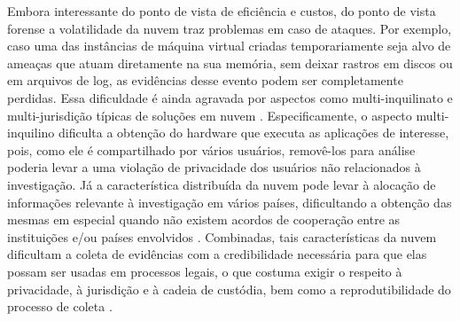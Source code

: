 \documentclass[conference]{IEEEtran}
\newcommand{\marcos}[1]{{\color{blue}{MARCOS: #1}}}
\begin{document}
%
Embora interessante do ponto de vista de eficiência e custos, do ponto de vista forense a volatilidade da nuvem traz problemas em caso de ataques.
%
Por exemplo, caso uma das instâncias de máquina virtual criadas temporariamente seja alvo de ameaças que atuam diretamente na sua memória, sem deixar rastros em discos ou em arquivos de log, as evidências desse evento podem ser completamente perdidas.
%
Essa dificuldade é ainda agravada por aspectos como multi-inquilinato e multi-jurisdição típicas de soluções em nuvem \cite{Bash2015a}.
%
Especificamente, o aspecto multi-inquilino dificulta a obtenção do hardware que executa as aplicações de interesse, pois, como ele é compartilhado por vários usuários, removê-los para análise poderia levar a uma violação de privacidade dos usuários não relacionados à investigação. 
%
Já a característica distribuída da nuvem pode levar à alocação de informações relevante à investigação em vários países, dificultando a obtenção das mesmas em especial quando não existem acordos de cooperação entre as instituições e/ou países envolvidos \cite{Dykstra2012a}.
%
Combinadas, tais características da nuvem dificultam a coleta de evidências com a credibilidade necessária para que elas possam ser usadas em processos legais,  o que costuma exigir o respeito à privacidade, à jurisdição e à cadeia de custódia, bem como a reprodutibilidade do processo de coleta \marcos{REFERENCIA SERIA MUITO BEM VINDA}.
\end{document}
